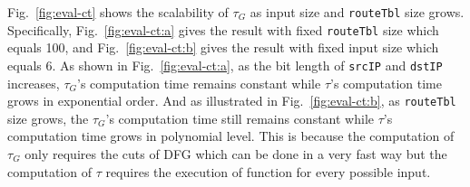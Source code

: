  Fig.~\ref{fig:eval-ct} shows the scalability of $\tau_G$ as input size and \texttt{routeTbl} size grows. Specifically, Fig.~\ref{fig:eval-ct:a} gives the result with fixed \texttt{routeTbl} size which equals 100, and Fig.~\ref{fig:eval-ct:b} gives the result with fixed input size which equals 6. As shown in Fig.~\ref{fig:eval-ct:a}, as the bit length of \texttt{srcIP} and \texttt{dstIP} increases, $\tau_G$'s computation time remains constant while $\tau$'s computation time grows in exponential order. And as illustrated in Fig.~\ref{fig:eval-ct:b}, as \texttt{routeTbl} size grows, the $\tau_G$'s computation time still remains constant while $\tau$'s computation time grows in polynomial level. This is because the computation of $\tau_G$ only requires the cuts of DFG which can be done in a very fast way but the computation of $\tau$ requires the execution of function for every possible input.






